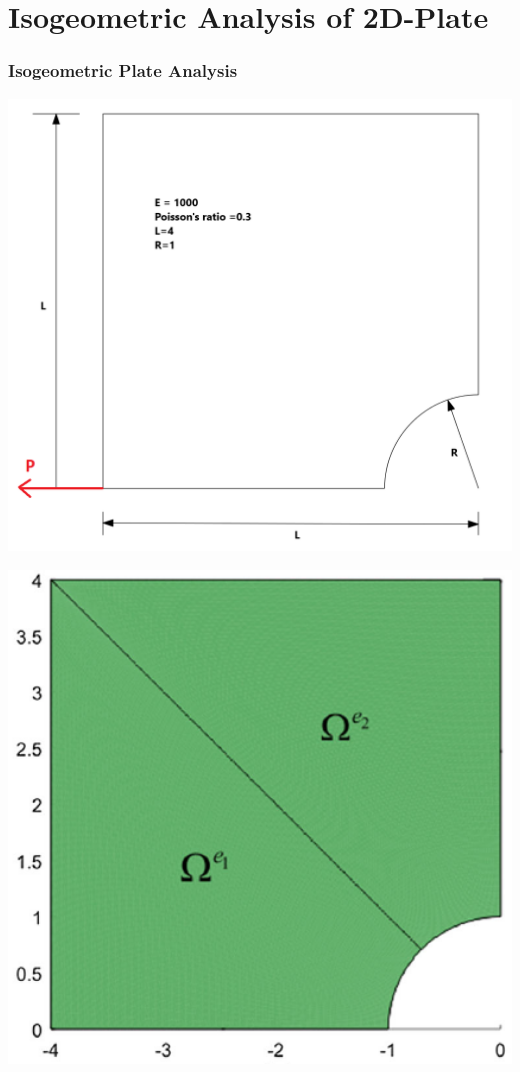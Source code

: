 \documentclass{beamer}
\begin{document}
\section{Isogeometric Analysis of 2D-Plate}
\begin{frame}[allowframebreaks] \frametitle{Isogeometric Plate Analysis}
\begin{minipage}[b]{0.48\linewidth}
    \includegraphics[width=1.0\textwidth,height=0.5\textheight]{figures/plate2.png} \\
    \centering \label{Underformed Plate}
  \end{minipage}
  \begin{minipage}[b]{0.48\linewidth}
    \includegraphics[width=1.0\textwidth,height=0.5\textheight]{figures/plate_elems.PNG} \\

\end{minipage}
\end{frame}
\end{document}
